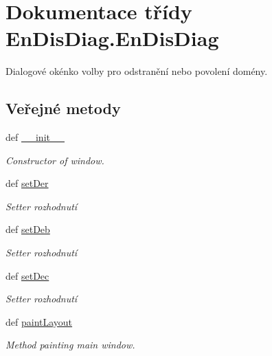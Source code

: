 \hypertarget{classEnDisDiag_1_1EnDisDiag}{\section{Dokumentace třídy En\-Dis\-Diag.\-En\-Dis\-Diag}
\label{d3/d66/classEnDisDiag_1_1EnDisDiag}
}


Dialogové okénko volby pro odstranění nebo povolení domény.  


\subsection*{Veřejné metody}
\begin{DoxyCompactItemize}
\item 
def \hyperlink{classEnDisDiag_1_1EnDisDiag_a71990008c3568a31c5ebe446eda17c43}{\-\_\-\-\_\-init\-\_\-\-\_\-}
\begin{DoxyCompactList}\small\item\em Constructor of window. \end{DoxyCompactList}\item 
def \hyperlink{classEnDisDiag_1_1EnDisDiag_a0cfd8a8ed0ad8ffa26cfc520da1e9031}{set\-Der}
\begin{DoxyCompactList}\small\item\em Setter rozhodnutí \end{DoxyCompactList}\item 
def \hyperlink{classEnDisDiag_1_1EnDisDiag_a90eb72639d531ca887c8dde3af71152f}{set\-Deb}
\begin{DoxyCompactList}\small\item\em Setter rozhodnutí \end{DoxyCompactList}\item 
def \hyperlink{classEnDisDiag_1_1EnDisDiag_a5fd914f7caba0fac306f4c15ad1a2abd}{set\-Dec}
\begin{DoxyCompactList}\small\item\em Setter rozhodnutí \end{DoxyCompactList}\item 
def \hyperlink{classEnDisDiag_1_1EnDisDiag_a05c9f97e8f2f618fd282ee4de26f9dd0}{paint\-Layout}
\begin{DoxyCompactList}\small\item\em Method painting main window. \end{DoxyCompactList}\end{DoxyCompactItemize}
